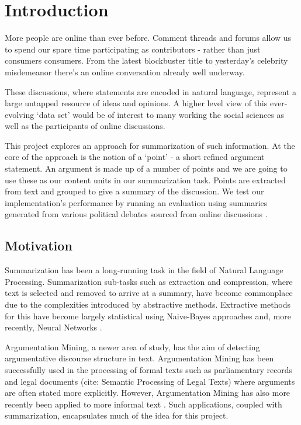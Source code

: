 \chapter{Introduction\label{chap:introduction}}
  More people are online than ever before. Comment threads and forums allow us to spend our spare time participating as contributors - rather than just consumers consumers. From the latest blockbuster title to yesterday's celebrity misdemeanor there's an online conversation already well underway.

  These discussions, where statements are encoded in natural language, represent a large untapped resource of ideas and opinions. A higher level view of this ever-evolving `data set' would be of interest to many working the social sciences as well as the participants of online discussions.

  This project explores an approach for summarization of such information. At the core of the approach is the notion of a `point' - a short refined argument statement. An argument is made up of a number of points and we are going to use these as our content units in our summarization task. Points are extracted from text and grouped to give a summary of the discussion. We test our implementation's performance by running an evaluation using summaries generated from various political debates sourced from online discussions \cite{walker2012corpus}.

  \section{Motivation}
    Summarization has been a long-running task in the field of Natural Language Processing. Summarization sub-tasks such as extraction and compression, where text is selected and removed to arrive at a summary, have become commonplace due to the complexities introduced by abstractive methods. Extractive methods for this have become largely statistical using Naive-Bayes \cite{kupiec1995trainable} approaches and, more recently, Neural Networks \cite{svore2007enhancing}.

    Argumentation Mining, a newer area of study, has the aim of detecting argumentative discourse structure in text. Argumentation Mining has been successfully used in the processing of formal texts such as parliamentary records \cite{palau2009argumentation} and legal documents (cite: Semantic Processing of Legal Texts) where arguments are often stated more explicitly. However, Argumentation Mining has also more recently been applied to more informal text \cite{park2015conditional}. Such applications, coupled with summarization, encapsulates much of the idea for this project.

